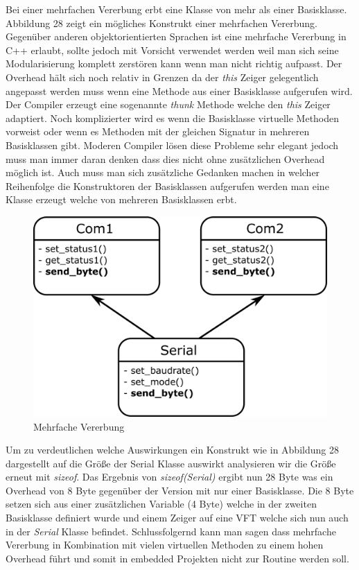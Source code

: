 \documentclass[MES,Master,ngerman]{twbook}%
\begin{document}
Bei einer mehrfachen Vererbung erbt eine Klasse von mehr als einer Basisklasse. Abbildung 28 zeigt ein mögliches Konstrukt einer mehrfachen Vererbung. Gegenüber anderen objektorientierten Sprachen ist eine mehrfache Vererbung in C++ erlaubt, sollte jedoch mit Vorsicht verwendet werden weil man sich seine Modularisierung komplett zerstören kann wenn man nicht richtig aufpasst. Der Overhead hält sich noch relativ in Grenzen da der \textit{this} Zeiger gelegentlich angepasst werden muss wenn eine Methode aus einer Basisklasse aufgerufen wird. Der Compiler erzeugt eine sogenannte \textit{thunk} Methode welche den \textit{this} Zeiger adaptiert. Noch komplizierter wird es wenn die Basisklasse virtuelle Methoden vorweist oder wenn es Methoden mit der gleichen Signatur in mehreren Basisklassen gibt. Moderen Compiler lösen diese Probleme sehr elegant jedoch muss man immer daran denken dass dies nicht ohne zusätzlichen Overhead möglich ist. Auch muss man sich zusätzliche Gedanken machen in welcher Reihenfolge die Konstruktoren der Basisklassen aufgerufen werden man eine Klasse erzeugt welche von mehreren Basisklassen erbt. \newpage
\begin{figure}[h]
	\centering
	\includegraphics[scale=0.65]{../Grafiken/Mehrfache_Vererbung.png}
	\caption{Mehrfache Vererbung}
	\label{fig:37}
\end{figure}

Um zu verdeutlichen welche Auswirkungen ein Konstrukt wie in Abbildung 28 dargestellt auf die Größe der Serial Klasse auswirkt  analysieren wir die Größe erneut mit \textit{sizeof}. Das Ergebnis von \textit{sizeof(Serial)} ergibt nun 28 Byte was ein Overhead von 8 Byte gegenüber der Version mit nur einer Basisklasse. Die 8 Byte setzen sich aus einer zusätzlichen Variable (4 Byte) welche in der zweiten Basisklasse definiert wurde und einem Zeiger auf eine VFT welche sich nun auch in der \textit{Serial} Klasse befindet. Schlussfolgernd kann man sagen dass mehrfache Vererbung in Kombination mit vielen virtuellen Methoden zu einem hohen Overhead führt und somit in embedded Projekten nicht zur Routine werden soll.
\end{document}
